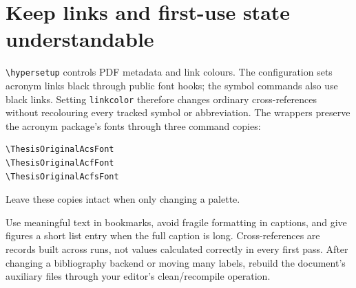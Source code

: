 \section{Keep links and first-use state understandable}
\verb|\hypersetup| controls PDF metadata and link colours. The configuration
sets acronym links black through public font hooks; the symbol commands also
use black links. Setting \texttt{linkcolor} therefore changes ordinary
cross-references without recolouring every tracked symbol or abbreviation.
The wrappers preserve the acronym package's fonts through three command copies:
\begin{lstlisting}
\ThesisOriginalAcsFont
\ThesisOriginalAcfFont
\ThesisOriginalAcfsFont
\end{lstlisting}
Leave these copies intact when only changing a palette.

Use meaningful text in bookmarks, avoid fragile formatting in captions, and
give figures a short list entry when the full caption is long. Cross-references
are records built across runs, not values calculated correctly in every first
pass. After changing a bibliography backend or moving many labels, rebuild
the document's auxiliary files through your editor's clean/recompile operation.
